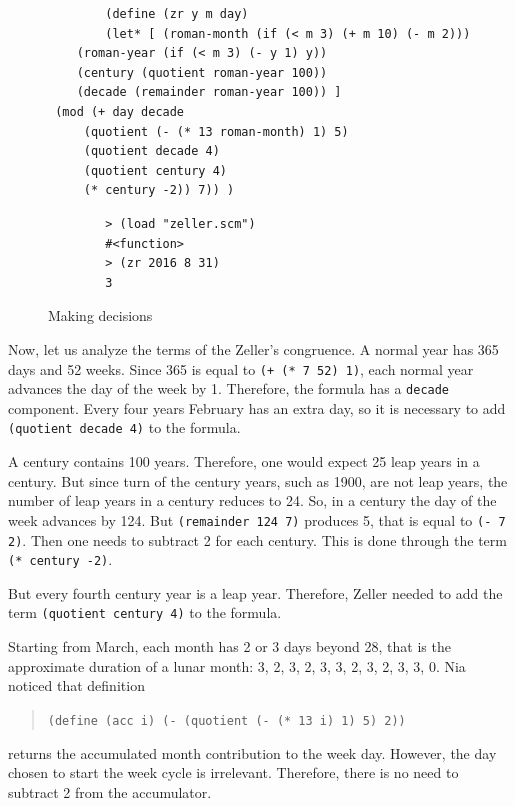 \documentclass[a4paper,12pt]{book}
\newenvironment{fmpage}[1]
{\begin{lrbox}{\fmbox}\begin{minipage}{#1}}
{\end{minipage}\end{lrbox}\fbox{\usebox{\fmbox}}}
\begin{document}
\begin{figure}[!h]
	\begin{fmpage}{0.9\linewidth}
		\begin{verbatim}
		(define (zr y m day)
		(let* [ (roman-month (if (< m 3) (+ m 10) (- m 2)))
	(roman-year (if (< m 3) (- y 1) y))
	(century (quotient roman-year 100))
	(decade (remainder roman-year 100)) ]
 (mod (+ day decade
	 (quotient (- (* 13 roman-month) 1) 5)
	 (quotient decade 4)
	 (quotient century 4)
	 (* century -2)) 7)) )
		\end{verbatim}
	\end{fmpage}

	\begin{fmpage}{0.9\linewidth}
		\begin{verbatim}
		> (load "zeller.scm")
		#<function>
		> (zr 2016 8 31)
		3
		\end{verbatim}
	\end{fmpage}
	\caption{Making decisions}
	\label{fig:zeller}
\end{figure}

Now, let us analyze the terms of the Zeller's
congruence. A
normal year has 365 days and 52 weeks.
Since 365 is equal to \verb|(+ (* 7 52) 1)|,
each normal year advances the day of the
week by 1. Therefore, the formula has a
\verb|decade| component.
Every four years
February has an extra day,
so it is necessary to add
\verb|(quotient decade 4)|
to the formula.

A century contains 100 years.
Therefore, one would expect  25
leap years in a century. But since
turn of the century years, such as 1900, are
not leap years, the number of leap
years in a century reduces to 24.
So, in a century the day of the
week advances by 124. But
\verb|(remainder 124 7)| produces
5, that is equal to \verb|(- 7 2)|.
Then one needs to subtract 2 for
each century. This is done through
the term \verb|(* century -2)|.

But every fourth century year is
a leap year. Therefore, Zeller needed to 
add the term \verb|(quotient century 4)|
to the formula.

Starting from March, each month
has 2 or 3 days beyond 28, that is
the approximate duration of a lunar
month: 3, 2,
3, 2, 3, 3, 2, 3, 2, 3, 3, 0.
Nia noticed that definition
\begin{quote}
	\verb|(define (acc i) (- (quotient (- (* 13 i) 1) 5) 2))|
\end{quote}
returns the accumulated month contribution
to the week day.
However, the day chosen to start
the week cycle is irrelevant. Therefore,
there is no need to subtract 2 from the
accumulator.
\end{document}
